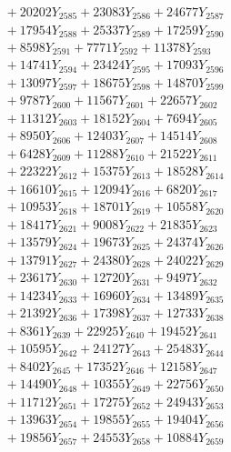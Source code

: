 \documentclass[a4paper,10pt]{article}
\begin{document}
{\begin{align}
&\;  + 20202 Y_{2585} + 23083 Y_{2586} + 24677 Y_{2587} \\[0.3ex]
&\;  + 17954 Y_{2588} + 25337 Y_{2589} + 17259 Y_{2590} \\[0.3ex]
&\;  + 8598 Y_{2591} + 7771 Y_{2592} + 11378 Y_{2593} \\[0.3ex]
&\;  + 14741 Y_{2594} + 23424 Y_{2595} + 17093 Y_{2596} \\[0.3ex]
&\;  + 13097 Y_{2597} + 18675 Y_{2598} + 14870 Y_{2599} \\[0.3ex]
&\;  + 9787 Y_{2600} + 11567 Y_{2601} + 22657 Y_{2602} \\[0.3ex]
&\;  + 11312 Y_{2603} + 18152 Y_{2604} + 7694 Y_{2605} \\[0.3ex]
&\;  + 8950 Y_{2606} + 12403 Y_{2607} + 14514 Y_{2608} \\[0.5ex]\allowbreak
&\;  + 6428 Y_{2609} + 11288 Y_{2610} + 21522 Y_{2611} \\[0.3ex]
&\;  + 22322 Y_{2612} + 15375 Y_{2613} + 18528 Y_{2614} \\[0.3ex]
&\;  + 16610 Y_{2615} + 12094 Y_{2616} + 6820 Y_{2617} \\[0.3ex]
&\;  + 10953 Y_{2618} + 18701 Y_{2619} + 10558 Y_{2620} \\[0.3ex]
&\;  + 18417 Y_{2621} + 9008 Y_{2622} + 21835 Y_{2623} \\[0.3ex]
&\;  + 13579 Y_{2624} + 19673 Y_{2625} + 24374 Y_{2626} \\[0.3ex]
&\;  + 13791 Y_{2627} + 24380 Y_{2628} + 24022 Y_{2629} \\[0.3ex]
&\;  + 23617 Y_{2630} + 12720 Y_{2631} + 9497 Y_{2632} \\[0.3ex]
&\;  + 14234 Y_{2633} + 16960 Y_{2634} + 13489 Y_{2635} \\[0.3ex]
&\;  + 21392 Y_{2636} + 17398 Y_{2637} + 12733 Y_{2638} \\[0.5ex]\allowbreak
&\;  + 8361 Y_{2639} + 22925 Y_{2640} + 19452 Y_{2641} \\[0.3ex]
&\;  + 10595 Y_{2642} + 24127 Y_{2643} + 25483 Y_{2644} \\[0.3ex]
&\;  + 8402 Y_{2645} + 17352 Y_{2646} + 12158 Y_{2647} \\[0.3ex]
&\;  + 14490 Y_{2648} + 10355 Y_{2649} + 22756 Y_{2650} \\[0.3ex]
&\;  + 11712 Y_{2651} + 17275 Y_{2652} + 24943 Y_{2653} \\[0.3ex]
&\;  + 13963 Y_{2654} + 19855 Y_{2655} + 19404 Y_{2656} \\[0.3ex]
&\;  + 19856 Y_{2657} + 24553 Y_{2658} + 10884 Y_{2659} \\[0.3ex]

\end{align}}
\end{document}
